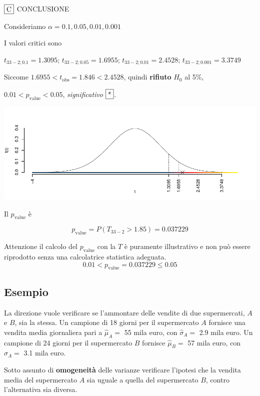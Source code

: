 \documentclass[
  11pt,
]{book}
\theoremstyle{mytheoremstyle}
\theoremstyle{mydefstyle}
\begin{document}
\(\fbox{C}\) CONCLUSIONE

Consideriamo \(\alpha=0.1, 0.05, 0.01, 0.001\)

I valori critici sono

\(t_{33-2;0.1}=1.3095\); \(t_{33-2;0.05}=1.6955\); \(t_{33-2;0.01}=2.4528\); \(t_{33-2;0.001}=3.3749\)

Siccome \(1.6955<t_\text{obs}=1.846<2.4528\), quindi \textbf{rifiuto} \(H_0\) al 5\%,

\(0.01<p_\text{value}<0.05\), \emph{significativo} \(\fbox{*}\).

\begin{center}\includegraphics{Appunti_di_Statistica_2025_files/figure-latex/16-test-2C-1-1} \end{center}

Il \(p_{\text{value}}\) è

\[ p_{\text{value}} = P(T_{33-2}>1.85)=0.037229 \]

Attenzione il calcolo del \(p_\text{value}\) con la \(T\) è puramente illustrativo e non può essere riprodotto senza una calcolatrice statistica adeguata.\[
 0.01 < p_\text{value}= 0.037229 \leq 0.05 
\]

\subsection{Esempio}\label{esempio-4}

La direzione vuole verificare se l'ammontare delle vendite di due
supermercati, \(A\) e \(B\), sia la stessa. Un campione di 18 giorni per
il supermercato \(A\) fornisce una vendita media giornaliera pari a
\(\hat\mu_A=\) 55 mila euro, con \(\hat\sigma_A=\) 2.9 mila euro. Un campione di 24
giorni per il supermercato \(B\) fornisce \(\hat\mu_B=\) 57 mila euro, con
\(\hat\sigma_A=\) 3.1 mila euro.

Sotto assunto di \textbf{omogeneità} delle varianze
verificare l'ipotesi che la vendita media del supermercato \(A\) sia uguale a quella del supermercato \(B\), contro l'alternativa sia diversa.
\end{document}
